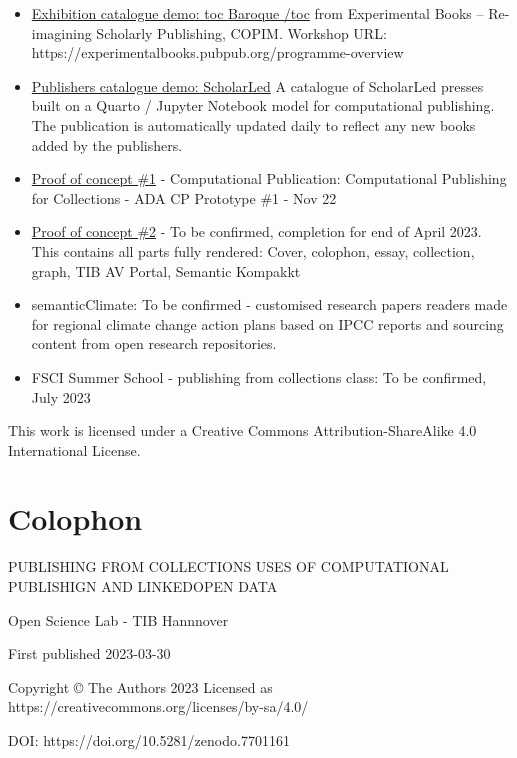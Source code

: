 \documentclass[
  letterpaper,
]{book}
\begin{document}
\begin{itemize}
\item
  \href{https://nfdi4culture.github.io/experimental-books-workshop/}{Exhibition
  catalogue demo: toc Baroque /toc} from Experimental Books --
  Re-imagining Scholarly Publishing, COPIM. Workshop URL:
  https://experimentalbooks.pubpub.org/programme-overview
\item
  \href{https://simonxix.github.io/scholarled_catalogue/}{Publishers
  catalogue demo: ScholarLed} A catalogue of ScholarLed presses built on
  a Quarto / Jupyter Notebook model for computational publishing. The
  publication is automatically updated daily to reflect any new books
  added by the publishers.
\item
  \href{https://nfdi4culture.github.io/cp4c/}{Proof of concept \#1} -
  Computational Publication: Computational Publishing for Collections -
  ADA CP Prototype \#1 - Nov 22
\item
  \href{https://nfdi4culture.github.io/art_catalogue_test/}{Proof of
  concept \#2} - To be confirmed, completion for end of April 2023. This
  contains all parts fully rendered: Cover, colophon, essay, collection,
  graph, TIB AV Portal, Semantic Kompakkt
\item
  semanticClimate: To be confirmed - customised research papers readers
  made for regional climate change action plans based on IPCC reports
  and sourcing content from open research repositories.
\item
  FSCI Summer School - publishing from collections class: To be
  confirmed, July 2023
\end{itemize}

This work is licensed under a Creative Commons Attribution-ShareAlike
4.0 International License.


\hypertarget{colophon}{%
\chapter{Colophon}\label{colophon}}

PUBLISHING FROM COLLECTIONS USES OF COMPUTATIONAL PUBLISHIGN AND
LINKEDOPEN DATA

Open Science Lab - TIB Hannnover

First published 2023-03-30

Copyright © The Authors 2023 Licensed as
https://creativecommons.org/licenses/by-sa/4.0/

DOI: https://doi.org/10.5281/zenodo.7701161
\end{document}
